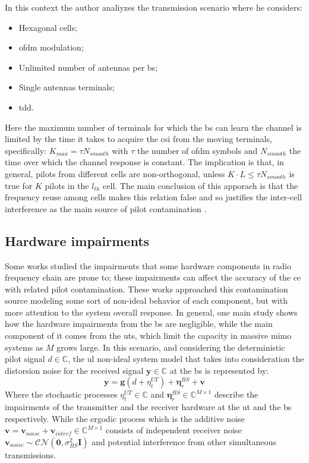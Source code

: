 \documentclass[11pt]{book}
\begin{document}
In this context the author analiyzes the transmission scenario where he considers:
\begin{itemize}
  \item Hexagonal cells;
  \item \gls{ofdm} modulation;
  \item Unlimited number of antennas per \gls{bs};
  \item Single antennas terminals;
  \item \gls{tdd}.
\end{itemize}
Here the maximum number of terminals for which the \gls{bs} can learn the channel is limited by the time it takes to acquire the \gls{csi} from the moving terminals, specifically: $K_{max} = \tau N_{smooth}$ with $\tau$ the number of \gls{ofdm} symbols and $N_{smooth}$ the time over which the channel response is constant. The implication is that, in general, pilots from different cells are non-orthogonal, unless $K\cdot L \leq \tau N_{smooth}$ is true for $K$ pilots in the $l_{th}$ cell. The main conclusion of this apporach is that the frequency reuse among cells makes this relation false and so justifies the inter-cell interference as the main source of pilot contamination \cite{Marzetta2010}.

\subsection{Hardware impairments}
Some works studied the impairments that some hardware components in radio frequency chain are prone to; these impairments can affect the accuracy of the \gls{ce} with related pilot contamination. These works approached this contamination source modeling some sort of non-ideal behavior of each component, but with more attention to the system overall response. In general, one main study \cite{Bjornson2014} shows how the hardware impairments from the \gls{bs} are negligible, while the main component of it comes from the \gls{ut}s, which limit the capacity in massive \gls{mimo} systems as $M$ grows large. In this scenario, and considering the deterministic pilot signal $d \in \mathbb{C}$, the \gls{ul} non-ideal system model that takes into consideration the distorsion noise for the received signal $\textbf{y} \in \mathbb{C}$ at the \gls{bs} is represented by:
\begin{equation}
  \textbf{y} = \textbf{g}(d + {\eta}_t^{UT}) + \boldsymbol{\eta}_r^{BS} + \textbf{v}
\end{equation}
Where the stochastic processes $\eta_t^{UT} \in \mathbb{C}$ and $\boldsymbol{\eta}_r^{BS} \in \mathbb{C}^{M\times 1}$ describe the impairments of the transmitter and the receiver hardware at the \gls{ut} and the \gls{bs} respectively. While the ergodic process which is the additive noise $\textbf{v} = \textbf{v}_{noise} + \textbf{v}_{interf} \in \mathbb{C}^{M\times 1}$ consists of independent receiver noise $\textbf{v}_{noise} \sim \mathcal{CN}(\textbf{0},\sigma_{BS}^2\textbf{I})$ and potential interference from other simultaneous transmissions.
\end{document}
